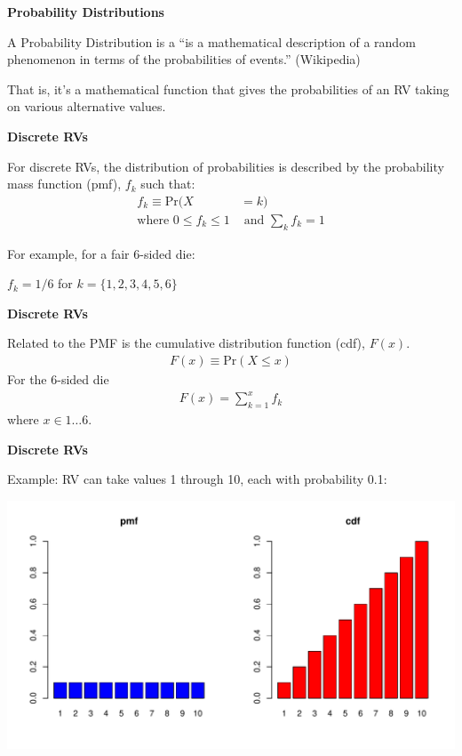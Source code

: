 \documentclass[12pt,xcolor=svgnames]{beamer}
\newcommand{\bl}{\color{blue}}
\newcommand{\theme}{\color{FireBrick}}
\newcommand{\sk}{\vspace{.4cm}}
\newcommand{\nsk}{\vspace{-.4cm}}
\newcommand{\chap}[1]{{\theme \Large \bf #1} \sk}
\newcommand{\pr}{\text{Pr}}
\begin{document}
\begin{frame}
\chap{Probability Distributions}

A {\bl Probability Distribution} is a ``is a mathematical description of a random phenomenon in terms of the probabilities of events.'' (Wikipedia)

\sk
That is, it's a mathematical function that gives the probabilities of an RV taking on various alternative values. 

\end{frame}



\begin{frame}
\chap{Discrete RVs}

For discrete RVs, the distribution of probabilities is described by the {\bl probability mass function} (pmf), $f_k$ such that:
\begin{align*}
f_k  \equiv \pr(X & = k) \\
\text{where } 0\leq f_k \leq 1 & \text{ and } \sum_k f_k = 1
\end{align*}
\nsk

For example, for a fair 6-sided die:

$f_k = 1/6$ for $k= \{1,2,3,4,5,6\}$

\end{frame}

\begin{frame}
\chap{Discrete RVs}

Related to the PMF is the {\bl cumulative distribution function} (cdf), $F(x)$. 
\begin{align*}
F(x) \equiv \pr(X \leq x)
\end{align*}
For the 6-sided die
\nsk
\begin{align*}
F(x)= \sum_{k=1}^x f_k
\end{align*}
where $x \in 1\dots 6$.  \\

\end{frame}


\begin{frame}
\chap{Discrete RVs}

Example: RV can take values 1 through 10, each with probability 0.1:

\begin{center}
\includegraphics[scale=0.4,trim=10 20 0 10]{discreteRVs}
\end{center}

\end{frame}
\end{document}
